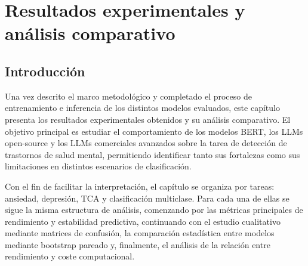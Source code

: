 %
%
%
% 
%
%
%
%

\chapter{Resultados experimentales y análisis comparativo}
\label{cha:resultados}

\section{Introducción}

Una vez descrito el marco metodológico y completado el proceso de entrenamiento e inferencia de los distintos modelos evaluados, este capítulo presenta los resultados experimentales obtenidos y su análisis comparativo. El objetivo principal es estudiar el comportamiento de los modelos \ac{BERT}, los \acp{LLM} open-source y los \acp{LLM} comerciales avanzados sobre la tarea de detección de trastornos de salud mental, permitiendo identificar tanto sus fortalezas como sus limitaciones en distintos escenarios de clasificación.

Con el fin de facilitar la interpretación, el capítulo se organiza por tareas: ansiedad, depresión, \ac{TCA} y clasificación multiclase. Para cada una de ellas se sigue la misma estructura de análisis, comenzando por las métricas principales de rendimiento y estabilidad predictiva, continuando con el estudio cualitativo mediante matrices de confusión, la comparación estadística entre modelos mediante bootstrap pareado y, finalmente, el análisis de la relación entre rendimiento y coste computacional.

